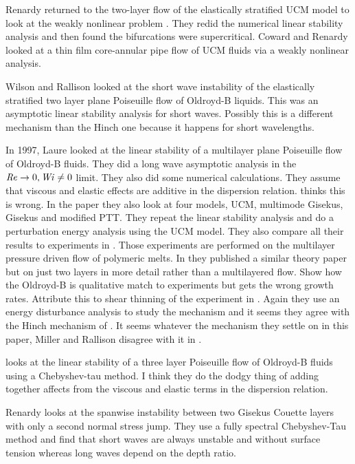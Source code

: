 \documentclass{jfm}
\newcommand\Wi{\mbox{\textit{Wi}}}
\newcommand\Rey{\mbox{\textit{Re}}}  %
\begin{document}
Renardy returned to the two-layer flow of the elastically stratified UCM model
to look at the weakly nonlinear problem \citep{Renardy1995b}. They redid the
numerical linear stability analysis and then found the bifurcations were
supercritical. Coward and Renardy \citep{Coward1997} looked at a thin film
core-annular pipe flow of UCM fluids via a weakly nonlinear analysis.

Wilson and Rallison \citep{Wilson1997} looked at the short wave instability of
the elastically stratified two layer plane Poiseuille flow of Oldroyd-B liquids.
This was an asymptotic linear stability analysis for short waves. Possibly this
is a different mechanism than the Hinch one because it happens for short
wavelengths. 

In 1997, Laure \citep{Laure1997} looked at the linear stability of a multilayer
plane Poiseuille flow of Oldroyd-B fluids. They did a long wave asymptotic
analysis in the $\Rey \rightarrow 0, \Wi \neq 0$ limit. They also did some
numerical calculations. They assume that viscous and elastic effects are
additive in the dispersion relation. \citet{Ganpule1998} thinks this is wrong.
In the \citet{Ganpule1998} paper they also look at four models, UCM, multimode
Gisekus, Gisekus and modified PTT. They repeat the linear stability analysis
and do a perturbation energy analysis using the UCM model. They also compare
all their results to experiments in \citep{Khomami1997}. Those experiments are
performed on the multilayer pressure driven flow of polymeric melts. In
\citet{Ganpule1999} they published a similar theory paper but on just two
layers in more detail rather than a multilayered flow. Show how the Oldroyd-B
is qualitative match to experiments but gets the wrong growth rates. Attribute
this to shear thinning of the experiment in \citep{Khomami1997}. Again they use
an energy disturbance analysis to study the mechanism and it seems they agree
with the Hinch mechanism of \citep{Hinch1992}.  It seems whatever the mechanism
they settle on in this paper, Miller and Rallison disagree with it in
\citep{Miller2007a}. 

\citet{Scotto1999} looks at the linear stability of a three layer Poiseuille
flow of Oldroyd-B fluids using a Chebyshev-tau method. I think they do the
dodgy thing of adding together affects from the viscous and elastic terms in
the dispersion relation.

Renardy \citep{Renardy1999} looks at the spanwise instability between two
Gisekus Couette layers with only a second normal stress jump. They use a fully
spectral Chebyshev-Tau method and find that short waves are always unstable and
without surface tension whereas long waves depend on the depth ratio.
\end{document}

